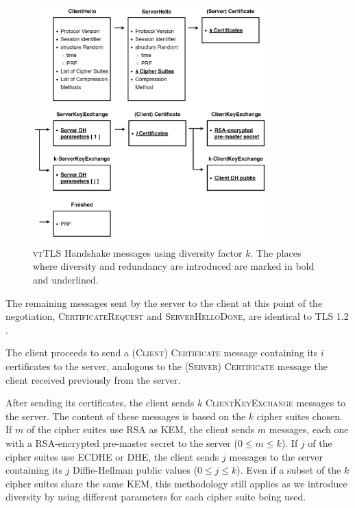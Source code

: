 \documentclass{sig-alternate-05-2015}
\newcommand{\msg}[1]{\textsc{{#1}}}
\begin{document}
\begin{figure}[t]
\includegraphics[width=9cm]{vttls-handshake}
\centering
\caption{\textsc{vtTLS} Handshake messages using diversity factor $k$. The places where diversity and redundancy are introduced are marked in bold and underlined.} %
\label{fig:vtTLS-example}
\end{figure}

The remaining messages sent by the server to the client at this point of the negotiation, \msg{CertificateRequest} and \msg{ServerHelloDone}, are identical to TLS 1.2 \cite{TLS1.2-5246}.

The client proceeds to send a \msg{(Client) Certificate} message containing its $i$ certificates to the server, analogous to the \msg{(Server) Certificate} message the client received previously from the server.

After sending its certificates, the client sends $k$ \msg{ClientKeyExchange} messages to the server. The content of these messages is based on the $k$ cipher suites chosen. If $m$ of the cipher suites use RSA as KEM, the client sends $m$ messages, each one with a RSA-encrypted pre-master secret to the server ($0 \leq m \leq k$). If $j$ of the cipher suites use ECDHE or DHE, the client sends $j$ messages to the server containing its $j$ Diffie-Hellman public values ($0 \leq j \leq k$). Even if a subset of the $k$ cipher suites share the same KEM, this methodology still applies as we introduce diversity by using different parameters for each cipher suite being used.
\end{document}
